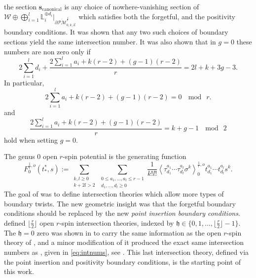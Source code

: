 \documentclass[11pt]{amsart}
\theoremstyle{definition}
\theoremstyle{remark}
\newcommand{\oPMr}{{{\overline{\mathcal{PM}}}^{\frac{1}{r}}_{0,k,\vec{a}}}}
\newcommand{\<}{\left<}
\renewcommand{\>}{\right>}
\numberwithin{equation}{section}
\begin{document}
the section $\mathbf{s}_{\text{canonical}}$ is any choice of nowhere-vanishing section of $\mathcal{W} \oplus \bigoplus_{i=1}^l\mathbb{L}_i^{\oplus d_i}|_{\partial\oPMr}$ which satisfies both %
the forgetful, and %
the positivity boundary conditions.  It was shown that any two such choices of boundary sections yield the same intersection number.
It was also shown that in $g=0$ these numbers are non zero only if
\begin{equation}\label{eq:dim_equal_rk}
2\sum_{i=1}^l d_i +\frac{2\sum_{i=1}^la_i+k(r-2)+(g-1)(r-2)}{r}=2l+k+3g-3.
\end{equation}
In %
particular, 
\begin{equation}\label{eq:mod_r_general_g}
{2\sum_{i=1}^la_i+k(r-2)+(g-1)(r-2)}=0~\mod~r.
\end{equation}
and %
\begin{equation}\label{eq:mod_2_general_g}
\frac{2\sum_{i=1}^la_i+k(r-2)+(g-1)(r-2)}{r} = k+g-1~\mod~2
\end{equation}
hold when setting $g=0.$ 


The genus $0$ open $r$-spin potential is the generating function
\[
F^{\frac{1}{r},o}_0(t^*_*,s):=\sum_{\substack{k,l\geq 0\\k+2l>2}} \sum_{\substack{0 \leq a_1, \ldots, a_l \leq r-1\\ d_1, \ldots, d_l \geq 0}} \frac{1}{k!l!}\<\tau^{a_1}_{d_1}\cdots\tau^{a_l}_{d_l}\sigma^k\>^{\frac{1}{r},o}_0 t^{a_1}_{d_1} \cdots t^{a_l}_{d_l}s^k.
\]
The goal of \cite{TZ1,TZ2} was to define intersection theories which allow more types of boundary twists.
The new geometric insight was that the forgetful boundary conditions should be replaced by the new \emph{point insertion boundary conditions}.
\cite{TZ2} defined $\lfloor\frac{r}{2}\rfloor$ open $r$-spin intersection theories, indexed by $\mathfrak{h}\in\{0,1,\ldots,\lfloor\frac{r}{2}\rfloor-1\}.$ The $\mathfrak{h}=0$ zero was shown in \cite[\S 5]{TZ2} to carry the same information as the open $r$-spin theory of \cite{BCT2}, and a minor modification of it produced the exact same intersection numbers as \cite{BCT2}, given %
in \eqref{eq:intnums}, see %
\cite[Remark 5.7]{TZ2}.
This last intersection theory, defined via the point insertion and positivity boundary conditions, is the starting point of this work.   
\end{document}
